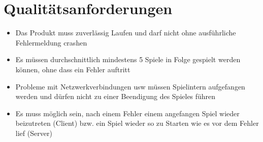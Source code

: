 \documentclass[a4paper,10pt]{article}
\begin{document}
\section{Qualitätsanforderungen}
\begin{itemize}
\item Das Produkt muss zuverlässig Laufen und darf nicht ohne ausführliche Fehlermeldung crashen
\item Es müssen durchschnittlich mindestens 5 Spiele in Folge gespielt werden können, ohne dass ein Fehler auftritt
\item Probleme mit Netzwerkverbindungen usw müssen Spielintern aufgefangen werden und dürfen nicht zu einer Beendigung des Spieles führen
\item Es muss möglich sein, nach einem Fehler einem angefangen Spiel wieder beizutreten (Client) bzw. ein Spiel wieder so zu Starten wie es vor dem Fehler lief (Server)
\end{itemize}
\end{document}
